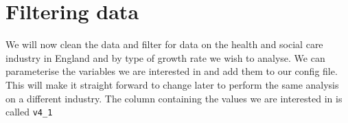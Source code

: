 \documentclass[
  letterpaper,
]{book}
\newenvironment{Shaded}{\begin{snugshade}}{\end{snugshade}}
\newcommand{\CommentTok}[1]{\textcolor[rgb]{0.37,0.37,0.37}{#1}}
\newcommand{\FunctionTok}[1]{\textcolor[rgb]{0.28,0.35,0.67}{#1}}
\newcommand{\NormalTok}[1]{\textcolor[rgb]{0.00,0.23,0.31}{#1}}
\newcommand{\OtherTok}[1]{\textcolor[rgb]{0.00,0.23,0.31}{#1}}
\newcommand{\SpecialCharTok}[1]{\textcolor[rgb]{0.37,0.37,0.37}{#1}}
\newcommand{\StringTok}[1]{\textcolor[rgb]{0.13,0.47,0.30}{#1}}
\begin{document}
\begin{Shaded}
\end{Shaded}

\hypertarget{filtering-data}{%
\section{Filtering data}\label{filtering-data}}

We will now clean the data and filter for data on the health and social
care industry in England and by type of growth rate we wish to analyse.
We can parameterise the variables we are interested in and add them to
our config file. This will make it straight forward to change later to
perform the same analysis on a different industry. The column containing
the values we are interested in is called \texttt{v4\_1}
\end{document}

